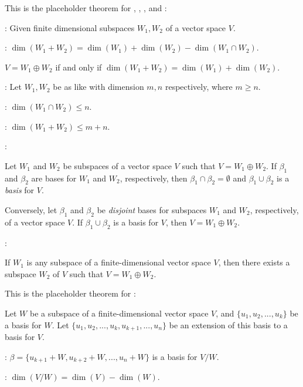 \begin{additional theorem} \label{athm 1.27}
This is the placeholder theorem for , , , and :

: Given finite dimensional subspaces \(W_1, W_2\) of a vector space \(V\).

: \(\dim(W_1 + W_2) = \dim(W_1) + \dim(W_2) - \dim(W_1 \cap W_2)\).

 \(V = W_1 \oplus W_2\) if and only if \(\dim(W_1 + W_2) = \dim(W_1) + \dim(W_2)\).

: Let \(W_1, W_2\) be as like  with dimension \(m, n\) respectively, where \(m \ge n\).

: \(\dim(W_1 \cap W_2) \le n\).

: \(\dim(W_1 + W_2) \le m + n\).

:

 Let \(W_1\) and \(W_2\) be subspaces of a vector space \(V\) such that \(V = W_1 \oplus W_2\).
If \(\beta_1\) and \(\beta_2\) are bases for \(W_1\) and \(W_2\), respectively, then \(\beta_1 \cap \beta_2 = \emptyset\) and \(\beta_1 \cup \beta_2\) is a \emph{basis} for \(V\).

 Conversely, let \(\beta_1\) and \(\beta_2\) be \emph{disjoint} bases for subspaces \(W_1\) and \(W_2\), respectively, of a vector space \(V\).
If \(\beta_1 \cup \beta_2\) is a basis for \(V\), then \(V = W_1 \oplus W_2\).
    
:

 If \(W_1\) is any subspace of a finite-dimensional vector space \(V\), then there exists a subspace \(W_2\) of \(V\) such that \(V = W_1 \oplus W_2\).
\end{additional theorem}

\begin{additional theorem} \label{athm 1.28}
This is the placeholder theorem for :

Let \(W\) be a subspace of a finite-dimensional vector space \(V\), and \(\{ u_1, u_2, ..., u_k \}\) be a basis for \(W\).
Let \(\{ u_1, u_2, ..., u_k, u_{k + 1}, ..., u_n \}\) be an extension of this basis to a basis for \(V\).

: \(\beta = \{ u_{k + 1} + W, u_{k + 2} + W, ..., u_n + W \}\) is a basis for \(V / W\).

: \(\dim(V/W) = \dim(V) - \dim(W)\).
\end{additional theorem}